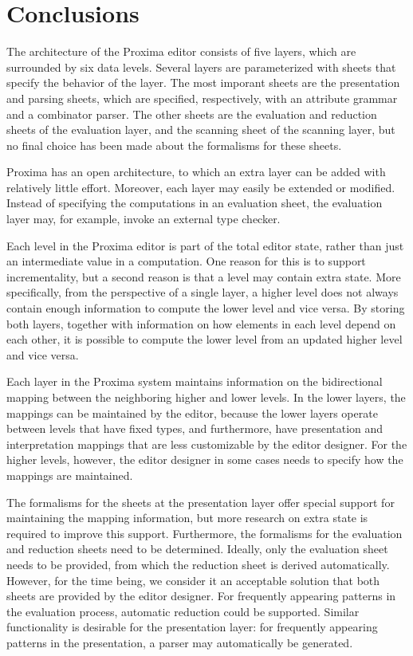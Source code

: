 \section{Conclusions}

The architecture of the Proxima editor consists of five layers, which are surrounded by six data levels. Several layers are parameterized with sheets that specify the behavior of the layer. The most imporant sheets are the presentation and parsing sheets, which are specified, respectively, with an attribute grammar and a combinator parser. The other sheets are the evaluation and reduction sheets of the evaluation layer, and the scanning sheet of the scanning layer, but no final choice has been made about the formalisms for these sheets.

Proxima has an open architecture, to which an extra layer can be added with relatively little effort. Moreover, each layer may easily be extended or modified. Instead of specifying the computations in an evaluation sheet, the evaluation layer may, for example, invoke an external type checker. 

Each level in the Proxima editor is part of the total editor state, rather than just an intermediate value in a computation. One reason for this is to support incrementality, but a second reason is that a level may contain extra state. More specifically, from the perspective of a single layer, a higher level does not always contain enough information to compute the lower level and vice versa. By storing both layers, together with information on how elements in each level depend on each other, it is possible to compute the lower level from an updated higher level and vice versa.

Each layer in the Proxima system maintains information on the bidirectional mapping between the neighboring higher and lower levels. In the lower layers, the mappings can be maintained by the editor, because the lower layers operate between levels that have fixed types, and furthermore, have presentation and interpretation mappings that are less customizable by the editor designer. For the higher levels, however, the editor designer in some cases needs to specify how the mappings are maintained. 

The formalisms for the sheets at the presentation layer offer special support for maintaining the mapping information, but more research on extra state is required to improve this support. Furthermore, the formalisms for the evaluation and reduction sheets need to be determined. Ideally, only the evaluation sheet needs to be provided, from which the reduction sheet is derived automatically. However, for the time being, we consider it an acceptable solution that both sheets are provided by the editor designer. For frequently appearing patterns in the evaluation process, automatic reduction could be supported. Similar functionality is desirable for the presentation layer: for frequently appearing patterns in the presentation, a parser may automatically be generated.
 

